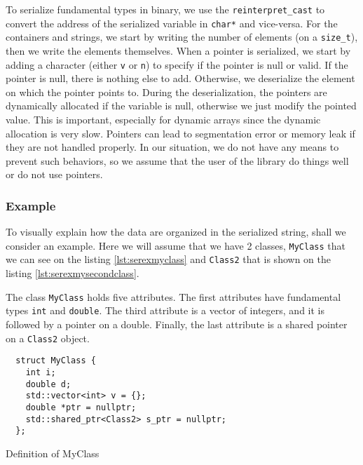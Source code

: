To serialize fundamental types in binary, we use the \texttt{reinterpret\_cast}
to convert the address of the serialized variable in \texttt{char*} and
vice-versa. For the containers and strings, we start by writing the number of
elements (on a \texttt{size\_t}), then we write the elements themselves. When a
pointer is serialized, we start by adding a character (either \texttt{v} or
\texttt{n}) to specify if the pointer is null or valid. If the pointer is null,
there is nothing else to add. Otherwise, we deserialize the element on which the
pointer points to. During the deserialization, the pointers are dynamically
allocated if the variable is null, otherwise we just modify the pointed value.
This is important, especially for dynamic arrays since the dynamic allocation is
very slow. Pointers can lead to segmentation error or memory leak if they are
not handled properly. In our situation, we do not have any means to prevent such
behaviors, so we assume that the user of the library do things well or do not
use pointers.

\subsubsection{Example}

To visually explain how the data are organized in the serialized string, shall
we consider an example. Here we will assume that we have 2 classes,
\texttt{MyClass} that we can see on the listing \ref{lst:serexmyclass} and
\texttt{Class2} that is shown on the listing
\ref{lst:serexmysecondclass}.

The class \texttt{MyClass} holds five attributes. The first attributes have
fundamental types \texttt{int} and \texttt{double}. The third attribute is a
vector of integers, and it is followed by a pointer on a double. Finally, the
last attribute is a shared pointer on a \texttt{Class2} object.

\begin{listing}[ht!]
\begin{verbatim}
  struct MyClass {
    int i;
    double d;
    std::vector<int> v = {};
    double *ptr = nullptr;
    std::shared_ptr<Class2> s_ptr = nullptr;
  };
\end{verbatim}
\caption{Definition of MyClass}
\label{lst:serexmyclass}
\end{listing}

